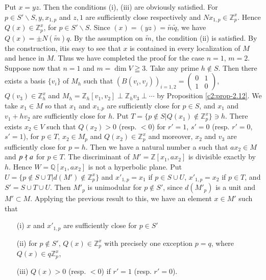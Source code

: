 Put $x=yz$. Then the conditions (i), (iii) are obviously
satisfied. For $p\in S'\backslash S, y, x_{1,p}$ and $z,1$ are
sufficiently close respectively and
$Nx_{1,p} \in \mathbb{Z}^x_p$. Hence
$Q(x) \in \mathbb{Z}^x_p$, for $p\in S'\backslash
S$. Since $(x)=(yz)=\tilde{m}\tilde{q}$, we have $Q(x)=\pm
N(\widetilde{m})q$. By the assumption on $\widetilde{m}$, the
condition (ii) is satisfied. By the construction, it\pageoriginale is
easy to see that $x$ is contained in every localization of $M$ and
hence in $M$. Thus we have completed the proof for the case $n=1$,
$m=2$. Suppose now that $n=1$ and $m=\dim V\geqq 3$. Take any prime
$h \not\in S$. Then there exists a basis $\{v_i\}$ of $M_h$ such that
$(B(v_i, v_j))_{i=1,2} = \left(\begin{smallmatrix}
0&1\\1&0\end{smallmatrix}\right)$, $Q(v_3)\in \mathbb{Z}^x_h$
and $M_h = \mathbb{Z}_h[v_1, v_2]\perp \mathbb{Z}_h v_3 \perp \cdots$
by Proposition \ref{c2:prop-2.12}. We take $x_1 \in M$ so that $x_1$ and
$x_{1,p}$ are sufficiently close for $p\in S$, and $x_1$ and
$v_1+hv_2$ are sufficiently close for $h$. Put $T=\{p \not\in
S|Q(x_1) \not\in\mathbb{Z}^x_p\} \ni h$. There exists $x_2 \in
V$ such that $Q(x_2)>0$ (resp. $<0$) for $r'=1$, $s'=0$ (resp. $r'=0$,
$s'=1$), for $p\in T$, $x_2 \in M_p$ and
$Q(x_2)\in \mathbb{Z}^x_p$ and moreover, $x_2$ and $v_3$ are
sufficiently close for $p=h$. Then we have a natural number a such
that $ax_2 \in M$ and $p\not\mid a$ for $p\in T$. The
discriminant of $M'=\mathbb{Z}[x_1, ax_2]$ is divisible exactly by
$h$. Hence $W=\mathbb{Q}[x_1, ax_2]$ is not a hyperbolic plane. Put
$U=\{p \not\in S \cup T|d(M') \not\in \mathbb{Z}^x_p\}$ and $x'_{1,p}
=x_1$ if $p\in S\cup U$, $x'_{1,p}=x_2$ if $p\in T$,
and $S'=S\cup T \cup U$. Then $M'_p$ is unimodular for $p\not\in S'$,
since $d(M'_p)$ is a unit and $M'\subset M$. Applying the previous
result to this, we have an element $x\in M'$ such that 
\begin{itemize}
\item[\rm{(i)}] $x$ and $x'_{1,p}$ are sufficiently close for
$p\in S'$

\item[\rm{(ii)}] for $p\not\in S'$, $Q(x)\in \mathbb{Z}^x_p$
with precisely one exception $p=q$, where $Q(x)\in
q \mathbb{Z}^x_p$, 

\item[\rm{(iii)}] $Q(x) >0$ (resp. $<0$) if $r'=1$ (resp. $r'=0$).
\end{itemize}

